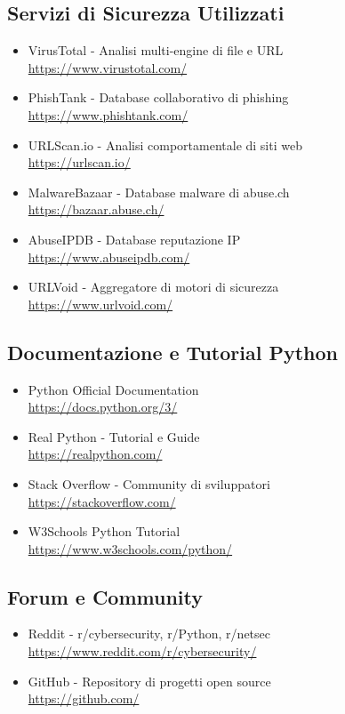\documentclass{article}
\begin{document}
\subsection{Servizi di Sicurezza Utilizzati}

\begin{itemize}
    \item VirusTotal - Analisi multi-engine di file e URL \\
    \url{https://www.virustotal.com/}
    \item PhishTank - Database collaborativo di phishing \\
    \url{https://www.phishtank.com/}
    \item URLScan.io - Analisi comportamentale di siti web \\
    \url{https://urlscan.io/}
    \item MalwareBazaar - Database malware di abuse.ch \\
    \url{https://bazaar.abuse.ch/}
    \item AbuseIPDB - Database reputazione IP \\
    \url{https://www.abuseipdb.com/}
    \item URLVoid - Aggregatore di motori di sicurezza \\
    \url{https://www.urlvoid.com/}
\end{itemize}

\subsection{Documentazione e Tutorial Python}

\begin{itemize}
    \item Python Official Documentation \\
    \url{https://docs.python.org/3/}
    \item Real Python - Tutorial e Guide \\
    \url{https://realpython.com/}
    \item Stack Overflow - Community di sviluppatori \\
    \url{https://stackoverflow.com/}
    \item W3Schools Python Tutorial \\
    \url{https://www.w3schools.com/python/}
\end{itemize}

\subsection{Forum e Community}

\begin{itemize}
    \item Reddit - r/cybersecurity, r/Python, r/netsec \\
    \url{https://www.reddit.com/r/cybersecurity/}
    \item GitHub - Repository di progetti open source \\
    \url{https://github.com/}
\end{itemize}
\end{document}
